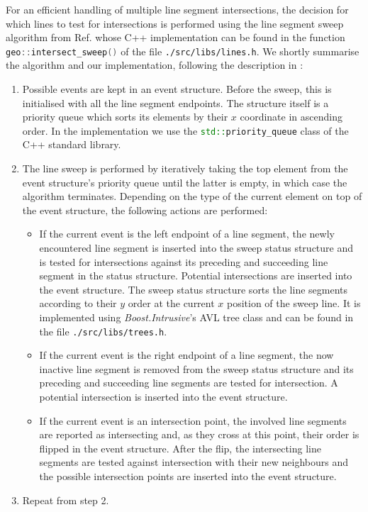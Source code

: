 For an efficient handling of multiple line segment intersections, the decision for which lines to test for intersections is
performed using the line segment sweep algorithm from Ref. \cite[pp. 69-80]{FUH_geo2020} whose C++ implementation can be
found in the function \lstinline[language=C++]|geo::intersect_sweep()| of the file \lstinline|./src/libs/lines.h|.
We shortly summarise the algorithm and our implementation, following the description in \cite[pp. 69-80]{FUH_geo2020}:
\begin{enumerate}
	\item Possible events are kept in an event structure. Before the sweep, this is initialised with all the line segment
		endpoints. The structure itself is a priority queue which sorts its elements by their $x$ coordinate in ascending order.
		In the implementation we use the \lstinline[language=C++]|std::priority_queue| class of the C++ standard library.
	\item The line sweep is performed by iteratively taking the top element from the event structure's priority queue until
		the latter is empty, in which case the algorithm terminates.
		Depending on the type of the current element on top of the event structure, the following actions are performed:
		\begin{itemize}
			\item If the current event is the left endpoint of a line segment, the newly encountered line segment is
				inserted into the sweep status structure and is tested for intersections against its preceding and succeeding
				line segment in the status structure. Potential intersections are inserted into the event structure.
				The sweep status structure sorts the line segments according to their $y$ order at the current $x$ position
				of the sweep line. It is implemented using \textit{Boost.Intrusive}'s \cite{web_boost_intrusive}
				AVL tree class \cite{web_boost_intrusive_avltree} and can be found in the file \lstinline|./src/libs/trees.h|.
			\item If the current event is the right endpoint of a line segment, the now inactive line segment is
				removed from the sweep status structure and its preceding and succeeding line segments are tested
				for intersection. A potential intersection is inserted into the event structure.
			\item If the current event is an intersection point, the involved line segments are reported as intersecting
				and, as they cross at this point, their order is flipped in the event structure.
				After the flip, the intersecting line segments are tested against intersection with their new neighbours
				and the possible intersection points are inserted into the event structure.
		\end{itemize}
	\item Repeat from step 2.
\end{enumerate}


